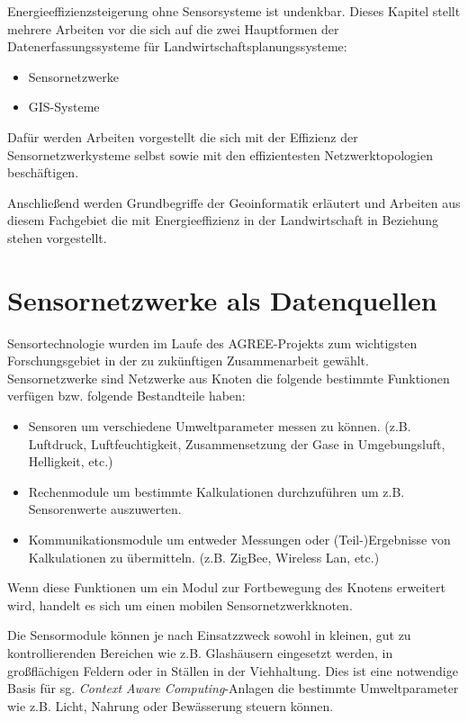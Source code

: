 Energieeffizienzsteigerung ohne Sensorsysteme ist undenkbar. Dieses Kapitel stellt mehrere Arbeiten vor die sich auf die zwei Hauptformen der Datenerfassungssysteme für Landwirtschaftsplanungssysteme:

\begin{itemize}
	\item Sensornetzwerke
	\item GIS-Systeme
\end{itemize}

Dafür werden Arbeiten vorgestellt die sich mit der Effizienz der Sensornetzwerkysteme selbst sowie mit den effizientesten Netzwerktopologien beschäftigen.

Anschließend werden Grundbegriffe der Geoinformatik erläutert und Arbeiten aus diesem Fachgebiet die mit Energieeffizienz in der Landwirtschaft in Beziehung stehen vorgestellt. 

\section{Sensornetzwerke als Datenquellen}
Sensortechnologie wurden im Laufe des AGREE-Projekts zum wichtigsten Forschungsgebiet in der zu zukünftigen Zusammenarbeit gewählt.\cite{misc:Mikkola2013} Sensornetzwerke sind Netzwerke aus Knoten die folgende bestimmte Funktionen verfügen bzw. folgende Bestandteile haben:
\begin{itemize}
	\item Sensoren um verschiedene Umweltparameter messen zu können. (z.B. Luftdruck, Luftfeuchtigkeit, Zusammensetzung der Gase in Umgebungsluft, Helligkeit, etc.)
	\item Rechenmodule um bestimmte Kalkulationen durchzuführen um z.B. Sensorenwerte auszuwerten.
	\item Kommunikationsmodule um entweder Messungen oder (Teil-)Ergebnisse von Kalkulationen zu übermitteln. (z.B. ZigBee, Wireless Lan, etc.)
\end{itemize}
Wenn diese Funktionen um ein Modul zur Fortbewegung des Knotens erweitert wird, handelt es sich um einen mobilen Sensornetzwerkknoten.\cite{jour:Howard2002}

Die Sensormodule können je nach Einsatzzweck sowohl in kleinen, gut zu kontrollierenden Bereichen wie z.B. Glashäusern eingesetzt werden, in großflächigen Feldern oder in Ställen in der Viehhaltung. Dies ist eine notwendige Basis für sg. \textit{Context Aware Computing}-Anlagen die bestimmte Umweltparameter wie z.B. Licht, Nahrung oder Bewässerung steuern können. 

